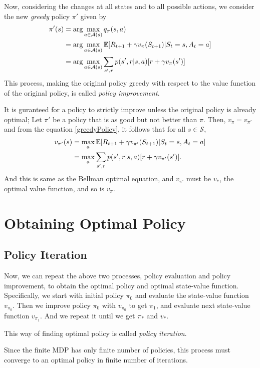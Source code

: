 \documentclass[../../main.tex]{subfiles}
\begin{document}
    Now, considering the changes at all states and to all possible actions, we consider the new \emph{greedy} policy $\pi'$ given by
    \begin{align}
        \pi'(s)&=\arg\max_{a \in \mathcal{A}(s)}q_\pi(s, a)\\
        &=\arg\max_{a \in \mathcal{A}(s)}\mathbb{E}[R_{t+1}+\gamma v_\pi(S_{t+1})|S_t=s,A_t=a] \label{greedyPolicy} \\ 
        &=\arg\max_{a \in \mathcal{A}(s)}\sum_{s',r}p(s',r|s,a)[r + \gamma v_\pi(s')]
    \end{align}
    This process, making the original policy greedy with respect to the value function of the original policy, is called \emph{policy improvement}.
    
    It is guranteed for a policy to strictly improve unless the original policy is already optimal; Let $\pi'$ be a policy that is as good but not better than $\pi$.
    Then, $v_\pi=v_{\pi'}$ and from the equation \ref{greedyPolicy}, it follows that for all $s \in \mathcal{S}$,
    \begin{align*}
        v_{\pi'}(s) &= \max_{a}\mathbb{E}[R_{t+1} + \gamma v_{\pi'}(S_{t+1})| S_t=s, A_t=a] \\
        &= \max_{a}\sum_{s',r}p(s',r|s,a)[r + \gamma v_{\pi'}(s')].
    \end{align*}
    And this is same as the Bellman optimal equation, and $v_{\pi'}$ must be $v_*$, the optimal value function, and so is $v_\pi$.

\section{Obtaining Optimal Policy}
    \subsection{Policy Iteration}
        Now, we can repeat the above two processes, policy evaluation and policy improvement, to obtain the optimal policy and optimal state-value function.
        Specifically, we start with initial policy $\pi_0$ and evaluate the state-value function $v_{\pi_0}$.
        Then we improve policy $\pi_0$ with $v_{\pi_0}$ to get $\pi_1$, and evaluate next state-value function $v_{\pi_1}$. And we repeat it until we get $\pi_*$ and $v_*$.
        
        This way of finding optimal policy is called \emph{policy iteration}.

        Since the finite MDP has only finite number of policies, this process must converge to an optimal policy in finite number of iterations.
        
\end{document}
